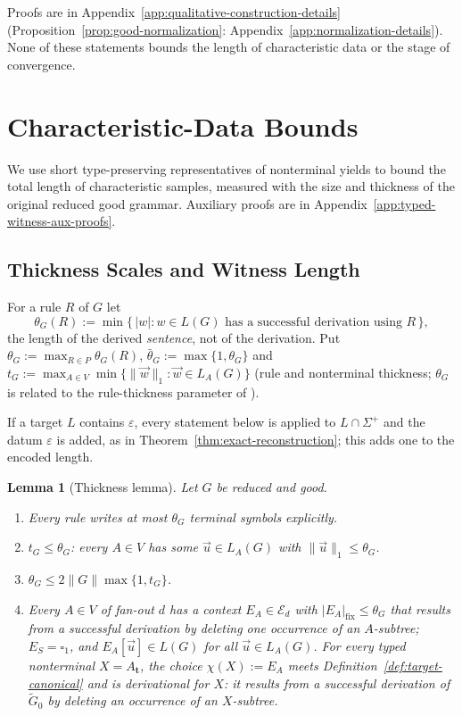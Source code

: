 \documentclass[11pt]{article}
\numberwithin{equation}{section}
\theoremstyle{plain}
\newtheorem{lemma}[theorem]{Lemma}
\theoremstyle{definition}
\theoremstyle{remark}
\newcommand{\tuple}[1]{\vec{#1}}
\newcommand{\blank}{\square}
\newcommand{\eps}{\varepsilon}
\theoremstyle{plain}
\begin{document}
Proofs are in Appendix~\ref{app:qualitative-construction-details}
(Proposition~\ref{prop:good-normalization}: Appendix~\ref{app:normalization-details}).
None of these statements bounds the length of characteristic data or the
stage of convergence.

\section{Characteristic-Data Bounds}
\label{sec:char-data}
We use short type-preserving representatives of nonterminal yields
to bound the total length of characteristic samples, measured with
the size and thickness of the original reduced good grammar.
Auxiliary proofs are in Appendix~\ref{app:typed-witness-aux-proofs}.

\subsection{Thickness Scales and Witness Length}
\label{subsec:thickness-contexts}

For a rule $R$ of $G$ let
\[
 \theta_G(R):=\min\{\,|w|:w\in L(G)\text{ has a successful derivation using }R\,\},
\]
the length of the derived \emph{sentence}, not of the derivation.  Put
$\theta_G:=\max_{R\in P}\theta_G(R)$, $\bar\theta_G:=\max\{1,\theta_G\}$ and
$t_G:=\max_{A\in V}\min\{\|\tuple w\|_1:\tuple w\in L_A(G)\}$ (rule and
nonterminal thickness; $\theta_G$ is related to the rule-thickness parameter of
\cite{Yoshinaka2011}).

If a target $L$ contains $\eps$, every statement below is applied to
$L\cap\Sigma^+$ and the datum $\eps$ is added, as in
Theorem~\ref{thm:exact-reconstruction}; this adds one to the encoded length.

\begin{lemma}[Thickness lemma]
\label{lem:thickness-equivalence}
\label{lem:thickness-local-bounds}
\label{lem:untyped-contexts}
Let $G$ be reduced and good.
\begin{enumerate}[label=\textup{(\roman*)},leftmargin=*]
\item Every rule writes at most $\theta_G$ terminal symbols explicitly.
\item $t_G\le\theta_G$: every $A\in V$ has some $\tuple u\in L_A(G)$ with
$\|\tuple u\|_1\le\theta_G$.
\item $\theta_G\le 2\|G\|\max\{1,t_G\}$.
\item Every $A\in V$ of fan-out $d$ has a context $E_A\in\mathcal E_d$ with
$|E_A|_{\mathrm{fix}}\le\theta_G$ that results from a successful derivation by
deleting one occurrence of an $A$-subtree; $E_S=\blank_1$, and
$E_A[\tuple u]\in L(G)$ for all $\tuple u\in L_A(G)$.  For every typed nonterminal
$X=A_{\mathbf t}$, the choice $\chi(X):=E_A$ meets
Definition~\ref{def:target-canonical} and is \emph{derivational} for $X$: it
results from a successful derivation of $\widetilde G_0$ by deleting an
occurrence of an $X$-subtree.
\end{enumerate}
\end{lemma}
\end{document}
